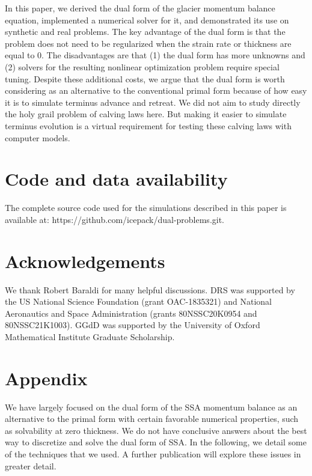 \documentclass[review,oneside]{igs}
\begin{document}
In this paper, we derived the dual form of the glacier momentum balance equation, implemented a numerical solver for it, and demonstrated its use on synthetic and real problems.
The key advantage of the dual form is that the problem does not need to be regularized when the strain rate or thickness are equal to 0.
The disadvantages are that (1) the dual form has more unknowns and (2) solvers for the resulting nonlinear optimization problem require special tuning.
Despite these additional costs, we argue that the dual form is worth considering as an alternative to the conventional primal form because of how easy it is to simulate terminus advance and retreat.
We did not aim to study directly the holy grail problem of calving laws here.
But making it easier to simulate terminus evolution is a virtual requirement for testing these calving laws with computer models.



\section{Code and data availability}

The complete source code used for the simulations described in this paper is available at: https://github.com/icepack/dual-problems.git.



\section{Acknowledgements}

We thank Robert Baraldi for many helpful discussions.
DRS was supported by the US National Science Foundation (grant OAC-1835321) and National Aeronautics and Space Administration (grants 80NSSC20K0954 and 80NSSC21K1003).
GGdD was supported by the University of Oxford Mathematical Institute Graduate Scholarship.




\pagebreak



\appendix\section{Appendix}

We have largely focused on the dual form of the SSA momentum balance as an alternative to the primal form with certain favorable numerical properties, such as solvability at zero thickness.
We do not have conclusive answers about the best way to discretize and solve the dual form of SSA.
In the following, we detail some of the techniques that we used.
A further publication will explore these issues in greater detail.
\end{document}
